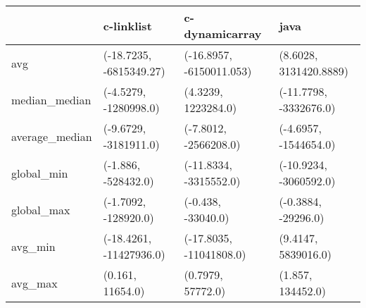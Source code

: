 \begin{tabular}{llll}
\toprule
{} &               c-linklist &            c-dynamicarray &                    java \\
\midrule
avg            &  (-18.7235, -6815349.27) &  (-16.8957, -6150011.053) &  (8.6028, 3131420.8889) \\
median\_median  &    (-4.5279, -1280998.0) &       (4.3239, 1223284.0) &  (-11.7798, -3332676.0) \\
average\_median &    (-9.6729, -3181911.0) &     (-7.8012, -2566208.0) &   (-4.6957, -1544654.0) \\
global\_min     &      (-1.886, -528432.0) &    (-11.8334, -3315552.0) &  (-10.9234, -3060592.0) \\
global\_max     &     (-1.7092, -128920.0) &        (-0.438, -33040.0) &     (-0.3884, -29296.0) \\
avg\_min        &  (-18.4261, -11427936.0) &   (-17.8035, -11041808.0) &     (9.4147, 5839016.0) \\
avg\_max        &         (0.161, 11654.0) &         (0.7979, 57772.0) &       (1.857, 134452.0) \\
\bottomrule
\end{tabular}
